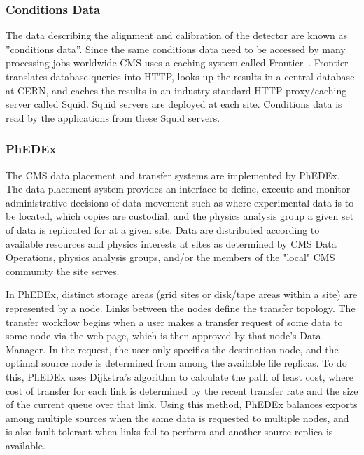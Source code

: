 \subsubsection{Conditions Data}
\label{sec:3_1_3}
The data describing the alignment and calibration of the detector are known as ''conditions data''. Since the same conditions data need to be accessed by many processing jobs worldwide CMS uses a caching system called Frontier~\cite{RefFrontier}.
Frontier translates database queries into HTTP, looks up the results in a central database at CERN, and caches the results in an industry-standard HTTP proxy/caching server called Squid. Squid servers are deployed at each site. Conditions data is read by the applications from these Squid servers.

\subsubsection{PhEDEx}
\label{sec:3_1_4}
The CMS data placement and transfer systems are implemented by
PhEDEx\cite{RefPhEDEx}. The data placement system provides an
interface to define, execute and monitor administrative decisions of
data movement such as where experimental data is to be located, which
copies are custodial, and %
the physics analysis group a given set of data is replicated for at a given site.
Data are distributed according to available resources
and physics interests at sites as determined by CMS Data Operations,
physics analysis groups, and/or the members of the "local" CMS community the site serves. 

In PhEDEx, distinct storage areas (grid sites or disk/tape areas
within a site) are represented by a node.  Links between the nodes
define the transfer topology.  The transfer workflow begins when a
user makes a transfer request of some data to some node via the web
page, which is then approved by that node's Data Manager.  In the
request, the user only specifies the destination node, and the optimal
source node is determined from among the available file replicas.  To
do this, PhEDEx uses Dijkstra's algorithm to calculate the path of
least cost, where cost of transfer for each link is determined by the
recent transfer rate and the size of the current queue over that link.
Using this method, PhEDEx balances exports among multiple sources when
the same data is requested to multiple nodes, and is also
fault-tolerant when links fail to perform and another source replica
is available.

